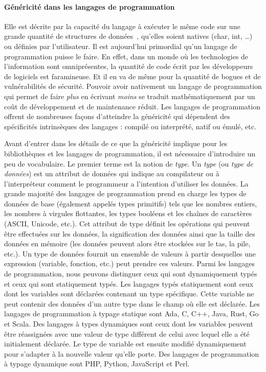 \paragraph{Généricité dans les langages de programmation} Elle est décrite par la capacité du langage à exécuter le même
code sur une grande quantité de structures de données~\parencite{dehnert.1998.fundamentals}, qu'elles soient natives
(char, int, \ldots) ou définies par l'utilisateur. Il est aujourd'hui primordial qu'un langage de programmation puisse
le faire. En effet, dans un monde où les technologies de l'information sont omniprésentes, la quantité de code écrit par
les développeurs de logiciels est faramineuse. Et il en va de même pour la quantité de bogues et de vulnérabilités de
sécurité. Pouvoir avoir nativement un langage de programmation qui permet de faire \emph{plus} en écrivant \emph{moins}
se traduit mathématiquement par un coût de développement et de maintenance réduit. Les langages de programmation offrent
de nombreuses façons d'atteindre la généricité qui dépendent des spécificités intrinsèques des langages : compilé ou
interprété, natif ou émulé, etc.

Avant d'entrer dans les détails de ce que la généricité implique pour les bibliothèques et les langages de
programmation, il est nécessaire d'introduire un peu de vocabulaire. Le premier terme est la notion de \emph{type}. Un
\emph{type} (ou \emph{type de données}) est un attribut de données qui indique au compilateur ou à l'interpréteur
comment le programmeur a l'intention d'utiliser les données. La grande majorité des langages de programmation prend en
charge les types de données de base (également appelés types primitifs) tels que les nombres entiers, les nombres à
virgules flottantes, les types booléens et les chaînes de caractères (ASCII, Unicode, etc.). Cet attribut de type
définit les opérations qui peuvent être effectuées sur les données, la signification des données ainsi que la taille des
données en mémoire (les données peuvent alors être stockées sur le tas, la pile, etc.). Un type de données fournit un
ensemble de valeurs à partir desquelles une expression (\cad variable, fonction, etc.) peut prendre ces valeurs. Parmi
les langages de programmation, nous peuvons distinguer ceux qui sont dynamiquement typés et ceux qui sont statiquement
typés. Les langages typés statiquement sont ceux dont les variables sont déclarées contenant un type spécifique. Cette
variable ne peut contenir des données d'un autre type dans le champ où elle est déclarée. Les langages de programmation
à typage statique sont Ada, C, C++, Java, Rust, Go et Scala. Des langages à types dynamiques sont ceux dont les
variables peuvent être réassignées avec une valeur de type différent de celui avec lequel elle a été initialement
déclarée. Le type de variable est ensuite modifié dynamiquement pour s'adapter à la nouvelle valeur qu'elle porte. Des
langages de programmation à typage dynamique sont PHP, Python, JavaScript et Perl.

